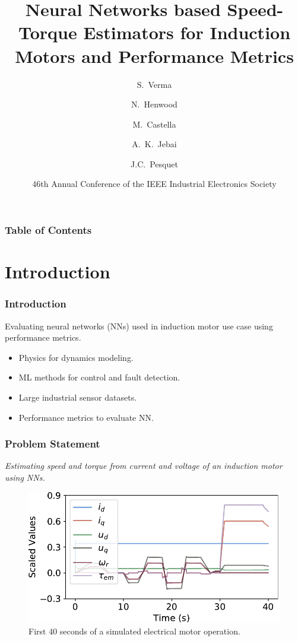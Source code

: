 \documentclass{beamer}
\title[] %
{Neural Networks based Speed-Torque Estimators for Induction Motors and Performance Metrics}
\author[Verma \etal] %
{S.~Verma\inst{1,2} \and N.~Henwood\inst{2} \and M.~Castella\inst{3} \and A.~K.~Jebai\inst{2} \and J.C.~Pesquet\inst{1}}
\institute[CVN and STIE] %
{
  \inst{1}%
  Universit\'{e} Paris-Saclay, CentraleSup\'{e}lec, Inria, Centre de Vision Num\'{e}rique
  \and
  \inst{2}%
  Schneider Toshiba Inverter Europe
  \and
  \inst{3}%
  SAMOVAR, T\'{e}l\'{e}com SudParis, Institut Polytechnique de Paris
}
\date[IECON 2020] %
{46th Annual Conference of the IEEE Industrial Electronics Society}
\begin{document}
\frame{\titlepage}


\begin{frame}
\frametitle{Table of Contents}
\tableofcontents
\end{frame}


\section{Introduction}

\begin{frame}
\frametitle{Introduction}
Evaluating neural networks (NNs) used in induction motor use case using performance metrics.

\begin{itemize}
    \item Physics for dynamics modeling.
    \item ML methods for control and fault detection.
    \item Large industrial sensor datasets.
    \item Performance metrics to evaluate NN.
\end{itemize}
\end{frame}



\begin{frame}
\frametitle{Problem Statement}

\textit{Estimating speed and torque from current and voltage of an induction motor using NNs.}

\begin{figure}[ht!]
    \centering
    \includegraphics[scale=0.4]{images/sim.pdf}
    \caption{First 40 seconds of a simulated electrical motor operation.}
    \label{fig:sim_raw_data}
\end{figure}

\end{frame}
\end{document}
